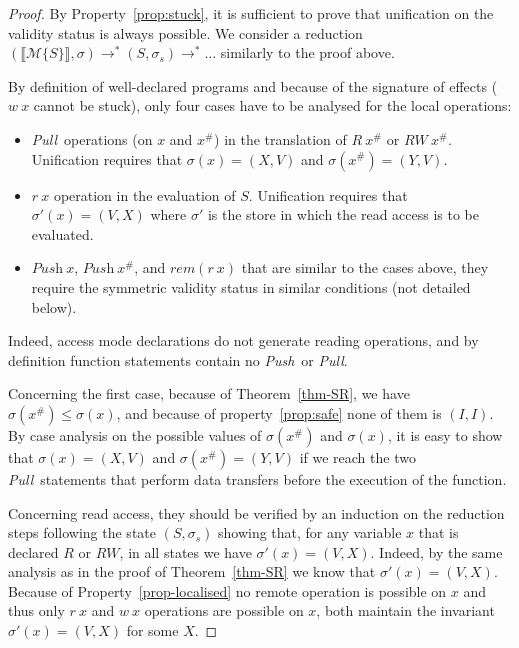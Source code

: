 \documentclass[preprint,12pt]{elsarticle}
\newcommand{\symb}[1]{\textit{#1}}
\newcommand{\Push}{\symb{Push}}
\newcommand{\Pull}{\symb{Pull}}
\newcommand{\isvalid}{\symb{isValid}}
\newcommand{\rem}[1]{\symb{rem}(#1)}
\newcommand{\transl}[1]{\llbracket#1\rrbracket}
\newcommand{\abs}[1]{#1^\#}
\newcommand{\AM}{\mathcal{M}}
\begin{document}
\begin{proof}
 By 
Property~\ref{prop:stuck}, 
it is sufficient to prove that 
unification on the validity status is always possible. 
We consider a reduction  $(\transl{\AM\{S\}},\sigma) \to^* (S,\sigma_s) \to^* \ldots$ 
similarly  to the proof above.

By definition of well-declared 
programs and because of the signature of effects ($w~x$ cannot be stuck), only four
cases have to be analysed for the local operations:
 \begin{itemize}
\item \Pull\ operations (on $x$ and $\abs x$) in the translation of $R~\abs x$ or 
$RW~\abs x$. Unification 
requires that $\sigma(x)=(X,V)$ and  $\sigma(\abs x)=(Y,V)$.
\item $r~x$ operation in the evaluation of $S$. Unification 
requires that $\sigma'(x)=(V,X)$ where $\sigma'$ is the store in which the read access is 
to be evaluated.
\item $\Push~x$, $\Push~\abs x$, and $\rem{r~x}$ that are similar to the cases above, they require the symmetric validity status in similar conditions (not detailed below).
\end{itemize}
Indeed, access mode declarations do not generate reading operations, and by definition 
function statements contain no \Push\ or \Pull.

Concerning the first case, because of Theorem~\ref{thm-SR}, we have $\sigma(\abs x)\leq 
\sigma(x)$, and because of property~\ref{prop:safe} none of them is $(I,I)$. By case 
analysis on the possible values of $\sigma(\abs x)$ and $\sigma(x)$, it is easy to show 
that $\sigma(x)=(X,V)$ and  $\sigma(\abs x)=(Y,V)$ if we reach the two \Pull\ statements 
that perform data transfers before the execution of the function.

Concerning read access, they should be verified by an induction on the reduction steps 
following the state $(S,\sigma_s)$ showing that, for any variable $x$ that is declared $R$ 
or $RW$, in all states we have $\sigma'(x)=(V,X)$. Indeed, by the same analysis as in the 
proof of 
Theorem~\ref{thm-SR} we know that $\sigma'(x)=(V,X)$. Because of 
Property~\ref{prop-localised} no remote operation is possible on $x$ and thus only $r~x$ 
and $w~x$ operations are possible on $x$, both maintain the invariant $\sigma'(x)=(V,X)$ 
for some $X$.
%
\end{proof}
\end{document}
